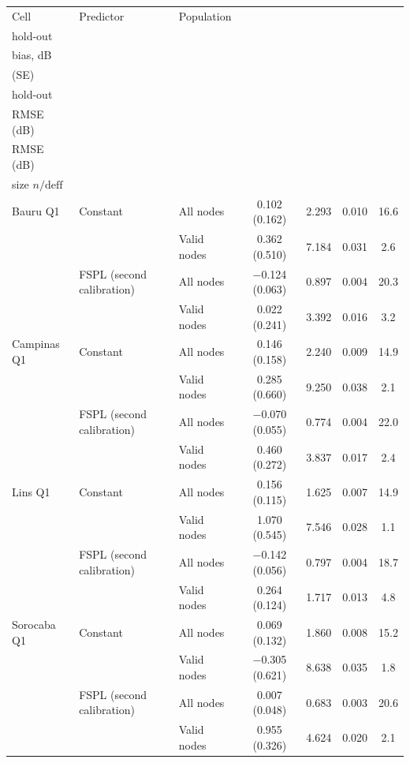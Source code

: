 \begin{tabular}{lllcccc}
\toprule
Cell & Predictor & Population & \celula{Block \\ \relax hold-out \\ \relax bias, dB \\ \relax (SE)} & \celula{Block \\ \relax hold-out \\ \relax RMSE (dB)} & \celula{Random-sample \\ \relax RMSE (dB)} & \celula{Effective \\ \relax size $n/\mathrm{deff}$} \\
\midrule
Bauru Q1 & Constant & All nodes & 0.102 (0.162) & 2.293 & 0.010 & 16.6 \\
 &  & Valid nodes & 0.362 (0.510) & 7.184 & 0.031 & 2.6 \\
 & FSPL (second calibration) & All nodes & $-$0.124 (0.063) & 0.897 & 0.004 & 20.3 \\
 &  & Valid nodes & 0.022 (0.241) & 3.392 & 0.016 & 3.2 \\
\midrule
Campinas Q1 & Constant & All nodes & 0.146 (0.158) & 2.240 & 0.009 & 14.9 \\
 &  & Valid nodes & 0.285 (0.660) & 9.250 & 0.038 & 2.1 \\
 & FSPL (second calibration) & All nodes & $-$0.070 (0.055) & 0.774 & 0.004 & 22.0 \\
 &  & Valid nodes & 0.460 (0.272) & 3.837 & 0.017 & 2.4 \\
\midrule
Lins Q1 & Constant & All nodes & 0.156 (0.115) & 1.625 & 0.007 & 14.9 \\
 &  & Valid nodes & 1.070 (0.545) & 7.546 & 0.028 & 1.1 \\
 & FSPL (second calibration) & All nodes & $-$0.142 (0.056) & 0.797 & 0.004 & 18.7 \\
 &  & Valid nodes & 0.264 (0.124) & 1.717 & 0.013 & 4.8 \\
\midrule
Sorocaba Q1 & Constant & All nodes & 0.069 (0.132) & 1.860 & 0.008 & 15.2 \\
 &  & Valid nodes & $-$0.305 (0.621) & 8.638 & 0.035 & 1.8 \\
 & FSPL (second calibration) & All nodes & 0.007 (0.048) & 0.683 & 0.003 & 20.6 \\
 &  & Valid nodes & 0.955 (0.326) & 4.624 & 0.020 & 2.1 \\
\bottomrule
\end{tabular}
